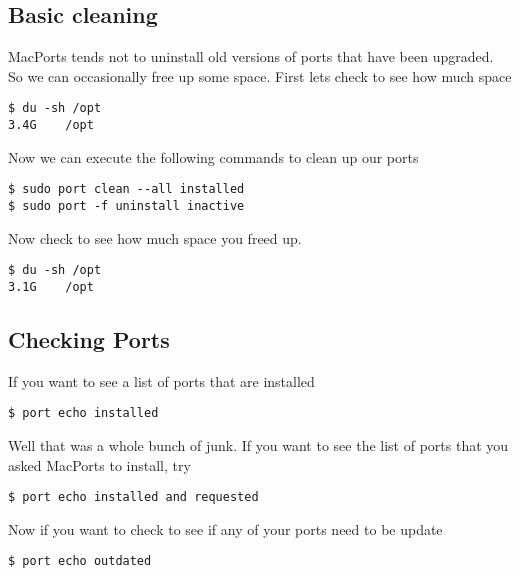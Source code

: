 \documentclass[11pt]{article}
\begin{document}
\subsection{Basic cleaning}
MacPorts tends not to uninstall old versions of ports that have been upgraded. So we can occasionally free up some space. First lets check to see how much space
\begin{lstlisting}[style=Bash]
$ du -sh /opt
3.4G	/opt
\end{lstlisting}
Now we can execute the following commands to clean up our ports
\begin{lstlisting}[style=Bash]
$ sudo port clean --all installed
$ sudo port -f uninstall inactive
\end{lstlisting}
Now check to see how much space you freed up.
\begin{lstlisting}[style=Bash]
$ du -sh /opt
3.1G	/opt
\end{lstlisting}


\subsection{Checking Ports}
If you want to see a list of ports that are installed
\begin{lstlisting}[style=Bash]
$ port echo installed
\end{lstlisting}
Well that was a whole bunch of junk. If you want to see the list of ports that you asked MacPorts to install, try
\begin{lstlisting}[style=Bash]
$ port echo installed and requested
\end{lstlisting}
Now if you want to check to see if any of your ports need to be update
\begin{lstlisting}[style=Bash]
$ port echo outdated
\end{lstlisting}
\end{document}

